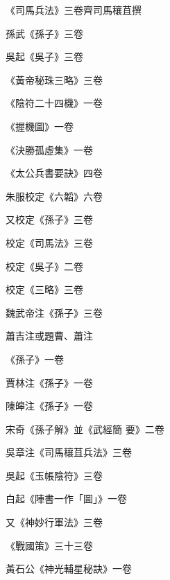 \begin{pinyinscope}
 《司馬兵法》三卷齊司馬穰苴撰



 孫武《孫子》三卷



 吳起《吳子》三卷



 《黃帝秘珠三略》三卷



 《陰符二十四機》一卷



 《握機圖》一卷



 《決勝孤虛集》一卷



 《太公兵書要訣》四卷



 朱服校定《六韜》六卷



 又校定《孫子》三卷



 校定《司馬法》三卷



 校定《吳子》二卷



 校定《三略》三卷



 魏武帝注《孫子》三卷



 蕭吉注或題曹、蕭注



 《孫子》一卷



 賈林注《孫子》一卷



 陳皞注《孫子》一卷



 宋奇《孫子解》並《武經簡
 要》二卷



 吳章注《司馬穰苴兵法》三卷



 吳起《玉帳陰符》三卷



 白起《陣書一作「圖」》一卷



 又《神妙行軍法》三卷



 《戰國策》三十三卷



 黃石公《神光輔星秘訣》一卷




\end{pinyinscope}
